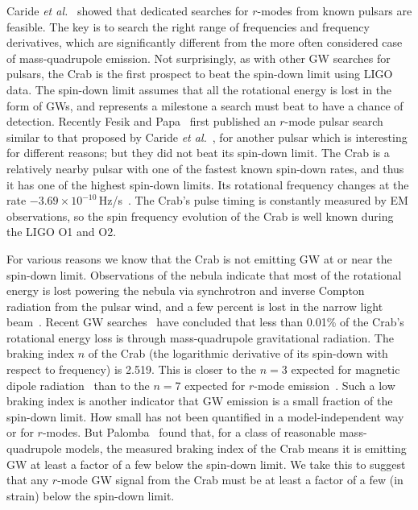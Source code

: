 \documentclass{ttuthes2007}
\begin{document}
Caride \textit{et al.}~\cite{PhysRevD.100.064013} showed that dedicated searches for
$r$-modes from known pulsars are feasible.
The key is to search the right range of frequencies and frequency derivatives,
which are significantly different from the more often considered case of
mass-quadrupole emission.
Not surprisingly, as with other \ac{GW} searches for pulsars, the Crab is the
first prospect to beat the spin-down limit using \ac{LIGO} data. The spin-down
limit assumes that all the rotational energy is
lost in the form of \acp{GW}, and represents a milestone a search must beat to
have a chance of detection.
Recently Fesik and Papa~\cite{Fesik2020} first published an $r$-mode pulsar
search similar to that proposed by Caride \textit{et
al.}~\cite{PhysRevD.100.064013}, for another pulsar which is interesting for different reasons; but they
did not beat its spin-down limit.
The Crab is a relatively nearby pulsar with one of
the fastest known spin-down rates, and thus it has one of the highest spin-down
limits. Its rotational frequency changes at the rate
$-3.69\times10^{-10}$\,Hz/s~\cite{JodrellBankObservatory}. The Crab's pulse timing is constantly
measured by \ac{EM} observations, so the spin frequency evolution of the Crab is well known
during the LIGO \ac{O1} and \ac{O2}.

For various reasons we know that the Crab is not emitting \ac{GW} at or near the
spin-down limit.
Observations of the nebula indicate that most of the rotational energy is lost
powering the nebula via synchrotron and inverse Compton radiation from the
pulsar wind, and a few percent is lost in the narrow light
beam~\cite{B_hler_2014}. Recent \ac{GW} searches~\cite{Abbott_2019, O3}
have concluded that less than 0.01\% of the Crab's rotational energy loss is
through mass-quadrupole gravitational radiation.
The braking index $n$ of the Crab (the logarithmic derivative of its spin-down
with respect to frequency) is 2.519.
This is closer to the $n=3$ expected for magnetic dipole
radiation~\cite{Lyne_2014} than to the $n=7$ expected for
$r$-mode emission~\cite{Owen_1998}.
Such a low braking index is another indicator that \ac{GW} emission is a small
fraction of the spin-down limit.
How small has not been quantified in a model-independent way or for $r$-modes.
But Palomba~\cite{Palomba2000} found that, for a class of reasonable
mass-quadrupole models, the measured braking index of the Crab means it is
emitting \ac{GW} at least a factor of a few below the spin-down limit.
We take this to suggest that any $r$-mode \ac{GW} signal from the Crab must be
at least a factor of a few (in strain) below the spin-down limit.
\end{document}

